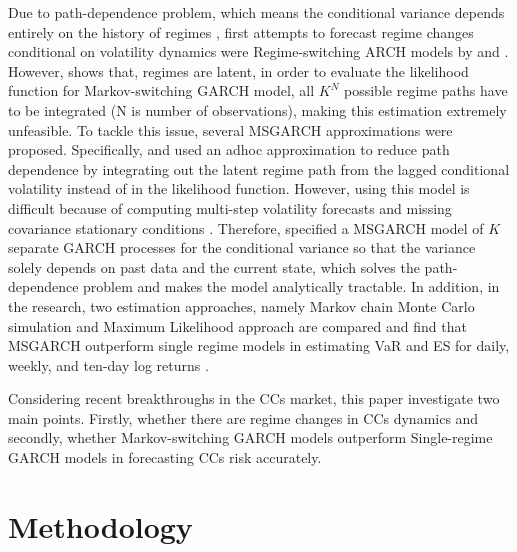 \documentclass[12pt,a4paper]{article}
\begin{document}
Due to path-dependence problem, which means the conditional variance depends entirely on the history of regimes \cite{haas2004new}, first attempts to forecast regime changes conditional on volatility dynamics were Regime-switching ARCH models by \cite{cai1994markov} and \cite{hamilton1994autoregressive}. However, \cite{gray1996modeling} shows that, regimes are latent, in order to evaluate the likelihood function for Markov-switching GARCH model, all $K^N$ possible regime paths have to be integrated (N is number of observations), making this estimation extremely unfeasible. To tackle this issue, several MSGARCH approximations were proposed. Specifically, \cite{dueker1997markov} and \cite{klaassen2002improving} used an adhoc approximation to reduce path dependence by integrating out the latent regime path from the lagged conditional volatility instead of in the likelihood function. However, using this model is difficult because of computing multi-step volatility forecasts and missing covariance stationary conditions \citep{haas2004new}. Therefore, \cite{ardia2018forecasting} specified a MSGARCH model of $K$ separate GARCH processes for the conditional variance so that the variance solely depends on past data and the current state, which solves the path-dependence problem and makes the model analytically tractable. In addition, in the research, two estimation approaches, namely Markov chain Monte Carlo simulation and Maximum Likelihood approach are compared and find that MSGARCH outperform single regime models in estimating VaR and ES for daily, weekly, and ten-day log returns \citep{caporale2019modelling}.\par 

Considering recent breakthroughs in the CCs market, this paper investigate two main points. Firstly, whether there are regime changes in CCs dynamics and secondly, whether Markov-switching GARCH models outperform Single-regime GARCH models in forecasting CCs risk accurately.\par 


\section{Methodology}
\end{document}
